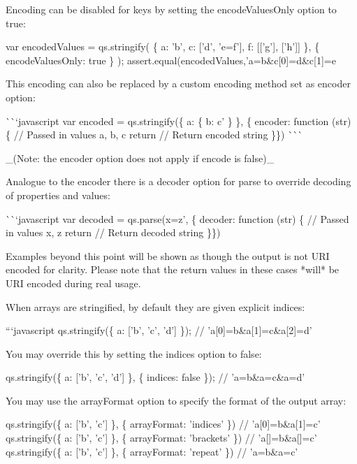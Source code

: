 Encoding can be disabled for keys by setting the {\ttfamily encode\+Values\+Only} option to {\ttfamily true}\+: 
\begin{DoxyCode}
var encodedValues = qs.stringify(
    \{ a: 'b', c: ['d', 'e=f'], f: [['g'], ['h']] \},
    \{ encodeValuesOnly: true \}
);
assert.equal(encodedValues,'a=b&c[0]=d&c[1]=e%
\end{DoxyCode}


This encoding can also be replaced by a custom encoding method set as {\ttfamily encoder} option\+:

\`{}\`{}`javascript var encoded = qs.\+stringify(\{ a\+: \{ b\+: \textquotesingle{}c' \} \}, \{ encoder\+: function (str) \{ // Passed in values {\ttfamily a}, {\ttfamily b}, {\ttfamily c} return // Return encoded string \}\}) \`{}\`{}\`{}

\+\_\+(Note\+: the {\ttfamily encoder} option does not apply if {\ttfamily encode} is {\ttfamily false})\+\_\+

Analogue to the {\ttfamily encoder} there is a {\ttfamily decoder} option for {\ttfamily parse} to override decoding of properties and values\+:

\`{}\`{}`javascript var decoded = qs.\+parse(\textquotesingle{}x=z', \{ decoder\+: function (str) \{ // Passed in values {\ttfamily x}, {\ttfamily z} return // Return decoded string \}\}) 
\begin{DoxyCode}
Examples beyond this point will be shown as though the output is not URI encoded for clarity. Please note
       that the return values in these cases *will* be URI encoded during real usage.

When arrays are stringified, by default they are given explicit indices:

```javascript
qs.stringify(\{ a: ['b', 'c', 'd'] \});
// 'a[0]=b&a[1]=c&a[2]=d'
\end{DoxyCode}


You may override this by setting the {\ttfamily indices} option to {\ttfamily false}\+:


\begin{DoxyCode}
qs.stringify(\{ a: ['b', 'c', 'd'] \}, \{ indices: false \});
// 'a=b&a=c&a=d'
\end{DoxyCode}


You may use the {\ttfamily array\+Format} option to specify the format of the output array\+:


\begin{DoxyCode}
qs.stringify(\{ a: ['b', 'c'] \}, \{ arrayFormat: 'indices' \})
// 'a[0]=b&a[1]=c'
qs.stringify(\{ a: ['b', 'c'] \}, \{ arrayFormat: 'brackets' \})
// 'a[]=b&a[]=c'
qs.stringify(\{ a: ['b', 'c'] \}, \{ arrayFormat: 'repeat' \})
// 'a=b&a=c'
\end{DoxyCode}


